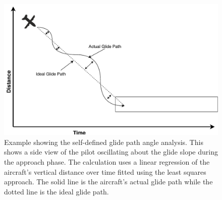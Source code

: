             
            \begin{figure}[t]
            	\centering
                \includegraphics[width=\linewidth]{img/self_defined_example}
                \caption{Example showing the self-defined glide path angle analysis.  This shows a side view of the pilot oscillating about the glide slope during the approach phase.  The calculation uses a linear regression of the aircraft's vertical distance over time fitted using the least squares approach.  The solid line is the aircraft's actual glide path while the dotted line is the ideal glide path.}
                \label{fig:self_defined_example}
            \end{figure}
            
